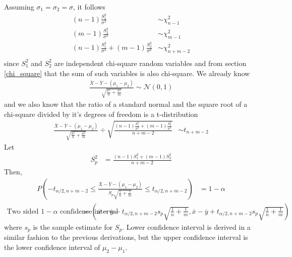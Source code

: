 \documentclass[../probability-notes.tex]{subfiles}
\begin{document}
    Assuming $\sigma_{1} = \sigma_{2} = \sigma$, it follows
    \begin{align*}
        (n-1)\frac{S_{1}^{2}}{\sigma^{2}} &\sim \chi_{n-1}^{2}\\
        (m-1)\frac{S_{2}^{2}}{\sigma^{2}} &\sim \chi_{m-1}^{2}\\
        (n-1)\frac{S_{1}^{2}}{\sigma^{2}} + (m-1)\frac{S_{2}^{2}}{\sigma^{2}} &\sim \chi_{n+m-2}^{2}\\
    \end{align*}
    since $S_{1}^{2}$ and $S_{2}^{2}$ are independent chi-square random variables and from section \ref{chi_square} that the sum of such variables is also chi-square.\newline
    We already know
    \begin{align*}
        \frac{\overline{X} - \overline{Y} - (\mu_{1} - \mu_{2})}{\sqrt{\frac{\sigma^{2}}{n} + \frac{\sigma^{2}}{m}}} \sim \mathcal{N}(0, 1)
    \end{align*}
    and we also know that the ratio of a standard normal and the square root of a chi-square divided by it's degrees of freedom is a t-distribution
    \begin{align*}
        \frac{\overline{X} - \overline{Y} - (\mu_{1} - \mu_{2})}{\sqrt{\frac{\sigma^{2}}{n} + \frac{\sigma^{2}}{m}}} \div \sqrt{\frac{(n-1)\frac{S_{1}^{2}}{\sigma^{2}} + (m-1)\frac{S_{2}^{2}}{\sigma^{2}}}{n+m-2}} &\sim t_{n+m-2}
    \end{align*}
    Let
    \begin{align*}
        S_{p}^{2} &= \frac{(n-1)S_{1}^{2} + (m-1)S_{2}^{2}}{n + m - 2}
    \end{align*}
    Then,
    \begin{align*}
        P(-t_{\alpha/2, n+m-2} \leq \frac{\overline{X} - \overline{Y} - (\mu_{1} - \mu_{2})}{S_{p}\sqrt{\frac{1}{n} + \frac{1}{m}}} \leq t_{\alpha/2, n+m-2}) &= 1 - \alpha
    \end{align*}
    \begin{align*}
        \text{Two sided $1 - \alpha$ confidence interval} &= (\overline{x} - \overline{y}-t_{\alpha /2, n+m-2}s_{p}\sqrt{\frac{1}{n} + \frac{1}{m}}, \overline{x} - \overline{y}+t_{\alpha /2, n+m-2}s_{p}\sqrt{\frac{1}{n} + \frac{1}{m}})
    \end{align*}
    where $s_{p}$ is the sample estimate for $S_{p}$. Lower confidence interval is derived in a similar fashion to the previous derivations, but the upper confidence interval is the lower confidence interval of $\mu_{2} - \mu_{1}$.
\end{document}
